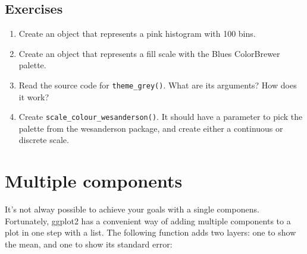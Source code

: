 \subsection{Exercises}

\begin{enumerate}
\def\labelenumi{\arabic{enumi}.}
\item
  Create an object that represents a pink histogram with 100 bins.
\item
  Create an object that represents a fill scale with the Blues
  ColorBrewer palette.
\item
  Read the source code for \texttt{theme\_grey()}. What are its
  arguments? How does it work?
\item
  Create \texttt{scale\_colour\_wesanderson()}. It should have a
  parameter to pick the palette from the wesanderson package, and create
  either a continuous or discrete scale.
\end{enumerate}

\section{Multiple components}

It's not alway possible to achieve your goals with a single componens.
Fortunately, ggplot2 has a convenient way of adding multiple components
to a plot in one step with a list. The following function adds two
layers: one to show the mean, and one to show its standard error:

\begin{Shaded}
\begin{Highlighting}[]
\StringTok{ }
  \NormalTok{(}
    \NormalTok{(} \NormalTok{, } \NormalTok{, } \NormalTok{),}
    \NormalTok{(} \NormalTok{, } \NormalTok{, } \NormalTok{)}
  \NormalTok{)}
\NormalTok{\}}
\StringTok{ }\NormalTok{()}
\StringTok{ }\NormalTok{()}
\end{Highlighting}
\end{Shaded}


